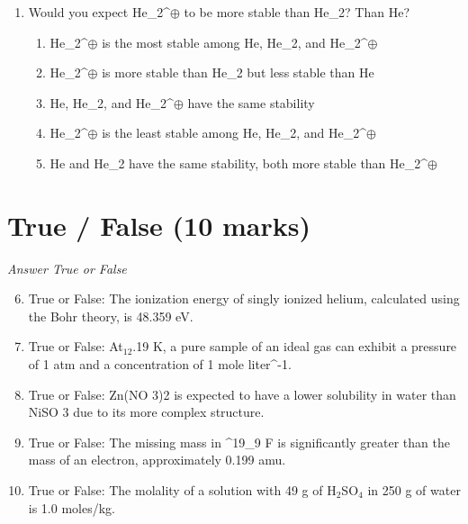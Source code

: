 \documentclass[12pt]{article}
\begin{document}
\begin{enumerate}[label=\arabic*.]
\begin{enumerate}[label=(\alph*)]
    \item .3582 : .4582 : .0582
    \item .2582 : .4998 : .3092
    \item .1582 : .6008 : .2092
    \item .1582 : .4998 : .1092
\end{enumerate}
\item Would you expect He\_2^\ensuremath{\oplus} to be more stable than He\_2? Than He?
\begin{enumerate}[label=(\alph*)]
    \item He\_2^\ensuremath{\oplus} is the most stable among He, He\_2, and He\_2^\ensuremath{\oplus}
    \item He\_2^\ensuremath{\oplus} is more stable than He\_2 but less stable than He
    \item He, He\_2, and He\_2^\ensuremath{\oplus} have the same stability
    \item He\_2^\ensuremath{\oplus} is the least stable among He, He\_2, and He\_2^\ensuremath{\oplus}
    \item He and He\_2 have the same stability, both more stable than He\_2^\ensuremath{\oplus}
\end{enumerate}
\end{enumerate}

\section*{True / False (10 marks)}
\textit{Answer True or False}
\begin{enumerate}[label=\arabic*.]
\setcounter{enumi}{5}
\item True or False: The ionization energy of singly ionized helium, calculated using the Bohr theory, is 48.359 eV.
\item True or False: At$_{12}$.19 K, a pure sample of an ideal gas can exhibit a pressure of 1 atm and a concentration of 1 mole liter^-1.
\item True or False: Zn(NO 3)2 is expected to have a lower solubility in water than NiSO 3 due to its more complex structure.
\item True or False: The missing mass in ^19\_9 F is significantly greater than the mass of an electron, approximately 0.199 amu.
\item True or False: The molality of a solution with 49 g of H$_{2}$SO$_{4}$ in 250 g of water is 1.0 moles/kg.
\end{enumerate}
\end{document}
